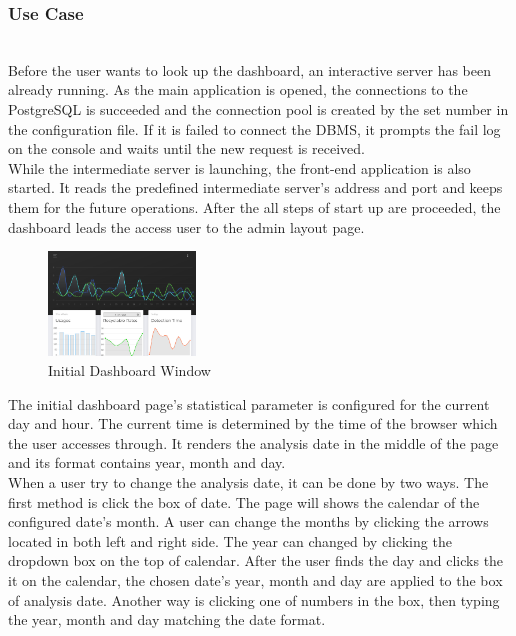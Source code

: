 \documentclass[conference]{IEEEtran}
\begin{document}
\subsubsection{Use Case}~\\
Before the user wants to look up the dashboard, an interactive server has been already running. As the main application is opened, the connections to the PostgreSQL is succeeded and the connection pool is created by the set number in the configuration file. If it is failed to connect the DBMS, it prompts the fail log on the console and waits until the new request is received.\\

While the intermediate server is launching, the front-end application is also started. It reads the predefined intermediate server's address and port and keeps them for the future operations. After the all steps of start up are proceeded, the dashboard leads the access user to the admin layout page.\\

\begin{figure}[h]
    \centering
    \includegraphics[width=0.35\textwidth]{images/dashboard_init_page.eps}
    \caption{Initial Dashboard Window}
\end{figure}

The initial dashboard page's statistical parameter is configured for the current day and hour. The current time is determined by the time of the browser which the user accesses through. It renders the analysis date in the middle of the page and its format contains year, month and day.\\

When a user try to change the analysis date, it can be done by two ways. The first method is click the box of date. The page will shows the calendar of the configured date's month. A user can change the months by clicking the arrows located in both left and right side. The year can changed by clicking the dropdown box on the top of calendar. After the user finds the day and clicks the it on the calendar, the chosen date's year, month and day are applied to the box of analysis date. Another way is clicking one of numbers in the box, then typing the year, month and day matching the date format.\\
\end{document}
